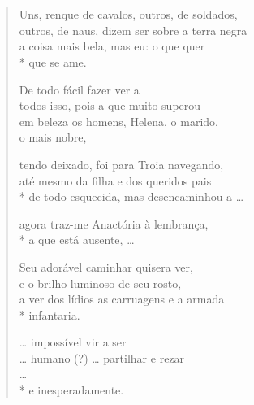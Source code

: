 {\section*{}
\section*{}

\begin{verse}
Uns, renque de cavalos, outros, de soldados,\\
outros, de naus, dizem ser sobre a terra negra\\
a coisa mais bela, mas eu: o que quer\\*
que se ame.

De todo fácil fazer ver a\\
todos isso, pois a que muito superou\\			
em beleza os homens, Helena, o marido, \\
o mais nobre,

tendo deixado, foi para Troia navegando,\\
até mesmo da filha e dos queridos pais\\*
de todo esquecida, mas desencaminhou-a \ldots{}

agora traz-me Anactória à lembrança,\\*
a que está ausente, \ldots{}

Seu adorável caminhar quisera ver,\\
e o brilho luminoso de seu rosto,\\
a ver dos lídios as carruagens e a armada\\*
infantaria.

\ldots{} impossível vir a ser\\
\ldots{} humano (?) \ldots{} partilhar e rezar\\
\ldots{}\\*
e inesperadamente.
\end{verse}

\pagebreak

}
